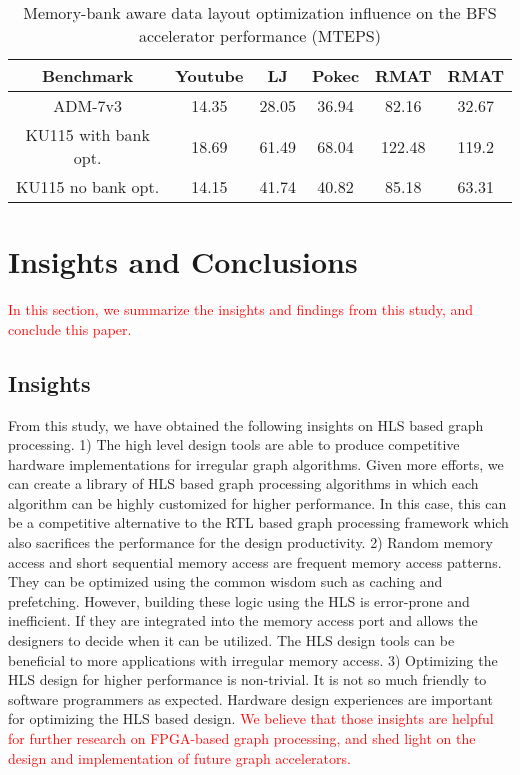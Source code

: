 \begin{table}
	\vspace{-0.5em}
	\centering
	\caption{Memory-bank aware data layout optimization influence on the BFS accelerator performance (MTEPS)}
	\label{tab:porting-summary}
	\vspace{-0.3em}
	\begin{tabular}{cccccc}
		\toprule
		Benchmark & Youtube & LJ & Pokec & RMAT\uppercase\expandafter{\romannumeral1} & RMAT\uppercase\expandafter{\romannumeral2} \\
		\midrule
		ADM-7v3 & 14.35 & 28.05 & 36.94 & 82.16 & 32.67 \\
		KU115 with bank opt. & 18.69 & 61.49 & 68.04 & 122.48 & 119.2 \\
		KU115 no bank opt. & 14.15 & 41.74 & 40.82 & 85.18 & 63.31\\
		\bottomrule
	\end{tabular}
	\vspace{-1em}
\end{table}





\section{Insights and Conclusions} \label{sec:conclusion}
\textcolor{red}{In this section, we summarize the insights and findings from this study, and conclude this paper.}
\subsection{Insights}
From this study, we have obtained the following insights on HLS based graph processing.
1) The high level design tools are able to produce competitive
hardware implementations for irregular graph algorithms. Given more efforts, we can 
create a library of HLS based graph processing algorithms in which each algorithm 
can be highly customized for higher performance. In this case, 
this can be a competitive alternative to the RTL based graph processing framework 
which also sacrifices the performance for the design productivity.
2) Random memory access and short sequential memory access are frequent memory access patterns.
They can be optimized using the common wisdom such as caching and prefetching. However, 
building these logic using the HLS is error-prone and inefficient. If they are integrated into 
the memory access port and allows the designers to decide when it can be utilized. 
The HLS design tools can be beneficial to more applications with irregular memory access.
3) Optimizing the HLS design for higher performance is non-trivial. It is not
so much friendly to software programmers as expected. Hardware design
experiences are important for optimizing the HLS based design.
\textcolor{red}{We believe that those insights are helpful for 
further research on FPGA-based graph processing, and shed light 
on the design and implementation of future graph accelerators.}
